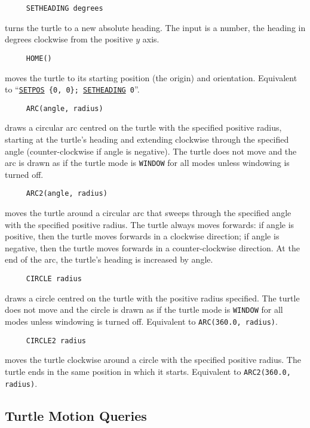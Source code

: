 \begin{verbatim}
     SETHEADING degrees
\end{verbatim}
\label{logoturtle:setheading}
turns the turtle to a new absolute heading.  The input is a number,
the heading in degrees clockwise from the positive $y$ axis.

\begin{verbatim}
     HOME()
\end{verbatim}
\label{logoturtle:home}
moves the turtle to its starting position (the origin) and orientation.
Equivalent to ``\texttt{\hyperref[logoturtle:setpos]{SETPOS}~\{0,~0\};
  \hyperref[logoturtle:setheading]{SETHEADING}~0}''.

\begin{verbatim}
     ARC(angle, radius)
\end{verbatim}
draws a circular arc centred on the turtle with the specified positive
radius, starting at the turtle's heading and extending clockwise
through the specified angle (counter-clockwise if angle is negative).
The turtle does not move and the arc is drawn as if the turtle mode is
\texttt{WINDOW} for all modes unless windowing is turned off.

\begin{verbatim}
     ARC2(angle, radius)
\end{verbatim}
moves the turtle around a circular arc that sweeps through the
specified angle with the specified positive radius.  The turtle always
moves forwards: if angle is positive, then the turtle moves forwards
in a clockwise direction; if angle is negative, then the turtle moves
forwards in a counter-clockwise direction.  At the end of the arc, the
turtle's heading is increased by angle.

\begin{verbatim}
     CIRCLE radius
\end{verbatim}
draws a circle centred on the turtle with the positive radius
specified.  The turtle does not move and the circle is drawn as if the
turtle mode is \texttt{WINDOW} for all modes unless windowing is
turned off.  Equivalent to \texttt{ARC(360.0, radius)}.

\begin{verbatim}
     CIRCLE2 radius
\end{verbatim}
moves the turtle clockwise around a circle with the specified positive
radius.  The turtle ends in the same position in which it starts.
Equivalent to \texttt{ARC2(360.0, radius)}.


\subsection{Turtle Motion Queries}

